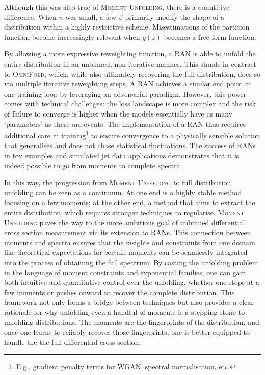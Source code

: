 {{        Although this was also true of \textsc{Moment Unfolding}, there is a quantitive difference.
        When $n$ was small, a few $\beta$ primarily modify the shape of a distribution within a highly restrictive scheme.
        Misestimations of the partition function become increasingly relevant when $g(z)$ becomes a free form function.

        By allowing a more expressive reweighting function, a RAN is able to unfold the entire distribution in an unbinned, non-iterative manner.
        This stands in contrast to \textsc{OmniFold}, which, while also ultimately recovering the full distribution, does so via multiple iterative reweighting steps.
        A RAN achieves a similar end point in one training loop by leveraging an adversarial paradigm.
        However, this power comes with technical challenges: the loss landscape is more complex and the risk of failure to converge is higher when the models essentially have as many `parameters' as there are events.
        The implementation of a RAN thus requires additional care in training\footnote{E.g., gradient penalty terms for WGAN, spectral normalisation, etc.} to ensure convergence to a physically sensible solution that generalises and does not chase statistical fluctuations.
        The success of RANs in toy examples and simulated jet data applications demonstrates that it is indeed possible to go from moments to complete spectra.

In this way, the progression from \textsc{Moment Unfolding} to full distribution unfolding can be seen as a continuum.
%
At one end is a highly stable method focusing on a few moments; at the other end, a method that aims to extract the entire distribution, which requires stronger techniques to regularise.
%
\textsc{Moment Unfolding} paves the way to the more ambitious goal of unbinned differential cross section measurement via its extension to RANs.
%
This connection between moments and spectra ensures that the insights and constraints from one domain like theoretical expectations for certain moments can be seamlessly integrated into the process of obtaining the full spectrum.
%
By casting the unfolding problem in the language of moment constraints and exponential families, one can gain both intuitive and quantitative control over the unfolding, whether one stops at a few moments or pushes onward to recover the complete distribution.
%
This framework not only forms a bridge between techniques but also provides a clear rationale for why unfolding even a handful of moments is a stepping stone to unfolding distributions.
%
The moments are the fingerprints of the distribution, and once one learns to reliably recover those fingerprints, one is better equipped to handle the the full differential cross section.

}}

